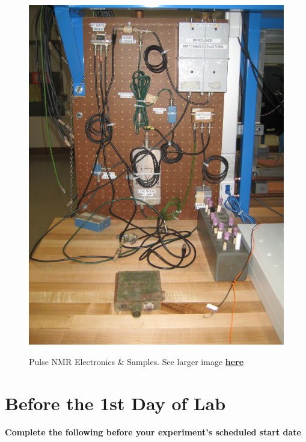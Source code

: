 \documentclass{../lab}
\begin{document}
\begin{figure}[h]
\begin{minipage}{0.32\textwidth}
    \href{http://experimentationlab.berkeley.edu/sites/default/files/images/PNMR_3495.jpg}{\includegraphics[width=\linewidth,keepaspectratio]{images/PNMR_3495.jpg}}
    \caption{Pulse NMR Electronics & Samples. See larger image \href{http://experimentationlab.berkeley.edu/sites/default/files/images/PNMR_3495.jpg}{\textbf{here}}}
\end{minipage}
\end{figure}

\section{Before the 1st Day of Lab}

\textbf{Complete the following before your experiment's scheduled start date}
\end{document}
